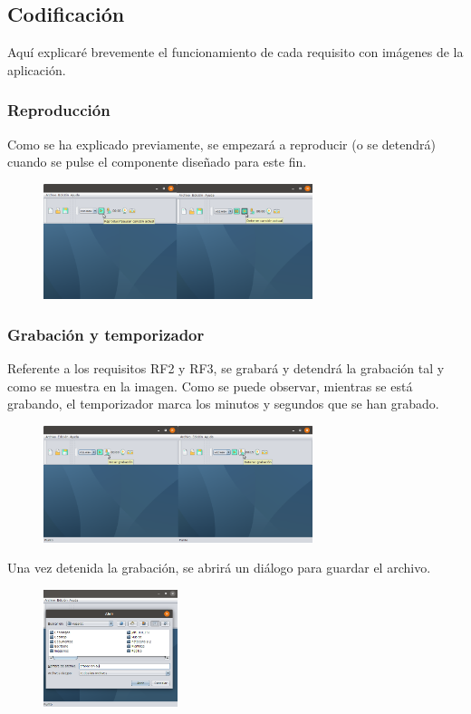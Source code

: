 \documentclass[11pt,a4paper]{article}
\begin{document}
\subsection{Codificación}
Aquí explicaré brevemente el funcionamiento de cada requisito con imágenes de la aplicación.

\subsubsection{Reproducción}
Como se ha explicado previamente, se empezará a reproducir (o se detendrá) cuando se pulse el componente diseñado para este fin.\\

\begin{figure}[H]
\centering
	\includegraphics[width=0.7\textwidth]{img/play-stop.png}
\end{figure}

\subsubsection{Grabación y temporizador}
Referente a los requisitos RF2 y RF3, se grabará y detendrá la grabación tal y como se muestra en la imagen. Como se puede observar, mientras se está grabando, el temporizador marca los minutos y segundos que se han grabado.

\begin{figure}[H]
\centering
	\includegraphics[width=0.7\textwidth]{img/grabacion.png}
\end{figure}

Una vez detenida la grabación, se abrirá un diálogo para guardar el archivo.

\begin{figure}[H]
\centering
	\includegraphics[width=0.35\textwidth]{img/guardar.png}
\end{figure}
\end{document}
